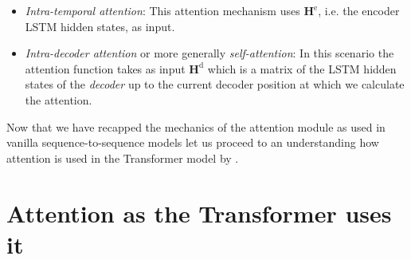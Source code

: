 \documentclass[11pt]{article}
\theoremstyle{definition}
\begin{document}
\begin{itemize}
	\item \textit{Intra-temporal attention}: This attention mechanism uses $\mathbf{H}^{\text{e}}$, i.e. the encoder LSTM hidden states, as input.
	\item \textit{Intra-decoder attention} or more generally \textit{self-attention}: In this scenario the attention function takes as input $\mathbf{H}^{\text{d}}$ which is a matrix of the LSTM hidden states of the \textit{decoder} up to the current decoder position at which we calculate the attention.
\end{itemize}
Now that we have recapped the mechanics of the attention module as used in vanilla sequence-to-sequence models let us proceed to an understanding how attention is used in the Transformer model by \cite{vaswani_attention_2017}.

\section{Attention as the Transformer uses it}




%


\appendix
\end{document}
